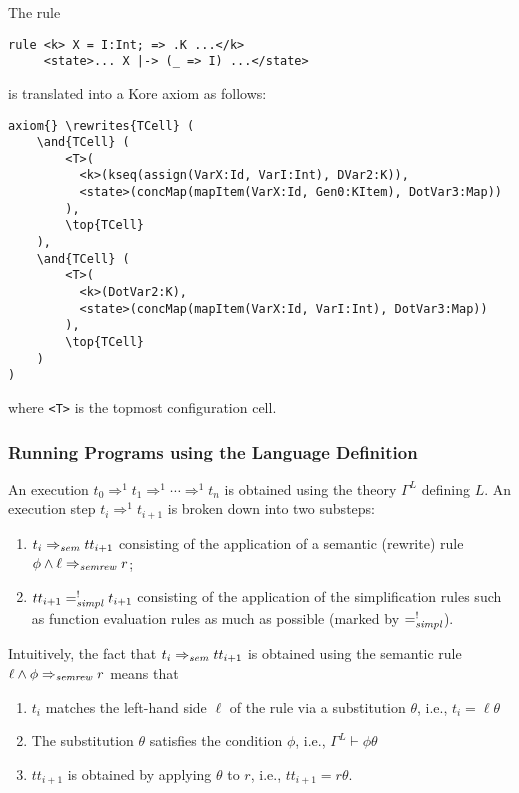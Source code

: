 \documentclass{article}
\theoremstyle{plain}
\theoremstyle{definition}
\begin{document}
The rule
\begin{verbatim}
rule <k> X = I:Int; => .K ...</k> 
     <state>... X |-> (_ => I) ...</state>
\end{verbatim}
is translated into a Kore axiom as follows:
\begin{verbatim}
axiom{} \rewrites{TCell} (
    \and{TCell} (
        <T>(
          <k>(kseq(assign(VarX:Id, VarI:Int), DVar2:K)),
          <state>(concMap(mapItem(VarX:Id, Gen0:KItem), DotVar3:Map))
        ),
        \top{TCell}
    ),
    \and{TCell} (
        <T>(
          <k>(DotVar2:K),
          <state>(concMap(mapItem(VarX:Id, VarI:Int), DotVar3:Map))
        ), 
        \top{TCell}
    )
)
\end{verbatim}
where \verb'<T>' is the topmost configuration cell.

\subsubsection{Running Programs using the Language Definition} \label{sec:running-programs}
\label{sec:run_lang_def}

An execution 
$t_0 \Rightarrow^1 t_1 \Rightarrow^1 \cdots \Rightarrow^1 t_n$
is obtained using the theory $\Gamma^L$ defining $L$.
An execution step $t_i  \Rightarrow^1 t_{i+1}$ is broken down into two substeps:
\begin{enumerate}
\item 
$t_i \Rightarrow_{\it sem} tt_{i+1}$ consisting of the application of a semantic (rewrite) rule $\phi \land \ell\Rightarrow_{\it semrew} r$;
\item 
$tt_ {i+1} =^!_ {\it simpl} t_ {i+1}$ consisting of the application of the simplification rules such as function evaluation rules as much as possible (marked by $=^!_ {\it simpl}$).
\end{enumerate}

Intuitively, the fact that $t_i  \Rightarrow_{\it sem} tt_{i+1}$ is obtained using the semantic rule $\ell \land \phi \Rightarrow_{\it semrew} r$ means that 
\begin{enumerate}
\item 
$t_i$ matches the left-hand side $\ell$ of the rule via a substitution $\theta$, i.e., $t_i=\ell\theta$
\item 
The substitution $\theta$ satisfies the condition $\phi$, i.e., $\Gamma^L\vdash \phi\theta$
\item 
$tt_ {i+1}$ is obtained by applying $\theta$ to $r$, i.e., $tt_ {i+1}=r\theta$.
\end{enumerate}
  
\end{document}
